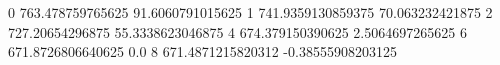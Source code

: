 0 763.478759765625 91.6060791015625
1 741.9359130859375 70.063232421875
2 727.20654296875 55.3338623046875
4 674.379150390625 2.5064697265625
6 671.8726806640625 0.0
8 671.4871215820312 -0.38555908203125
